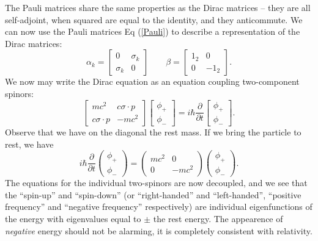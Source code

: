 The Pauli matrices share the same properties as the Dirac matrices -- they are all self-adjoint, when squared are equal to the identity, and they anticommute. We can now use the Pauli matrices Eq (\ref{Pauli}) to describe a representation of the Dirac matrices:
\begin{equation}
\alpha_k = \begin{bmatrix} 0 & \sigma_k \\ \sigma_k & 0 \end{bmatrix}\qquad \beta = \begin{bmatrix} 1_2 & 0 \\ 0 & -1_2 \end{bmatrix}.
\end{equation}
We now may write the Dirac equation as an equation coupling two-component spinors:
\begin{equation}
\begin{bmatrix} mc^2 & c\sigma\cdot p \\ c\sigma\cdot p & -mc^2 \end{bmatrix} \begin{bmatrix} \phi_+ \\ \phi_- \end{bmatrix} = i\hbar\frac{\partial}{\partial t}\begin{bmatrix} \phi_+ \\ \phi_- \end{bmatrix}.
\end{equation}
Observe that we have on the diagonal the rest mass. If we bring the particle to rest, we have
\begin{equation}
i\hbar\frac{\partial}{\partial t}\begin{pmatrix} \phi_+ \\ \phi_- \end{pmatrix} = \begin{pmatrix} mc^2 & 0 \\ 0 & -mc^2 \end{pmatrix} \begin{pmatrix} \phi_+ \\ \phi_- \end{pmatrix}.
\end{equation}
The equations for the individual two-spinors are now decoupled, and we see that the ``spin-up'' and ``spin-down'' (or ``right-handed'' and ``left-handed'', ``positive frequency'' and ``negative frequency'' respectively) are individual eigenfunctions  of the energy with eigenvalues equal to $\pm$ the rest energy. The appearence of \emph{negative} energy should not be alarming, it is completely consistent with relativity.

